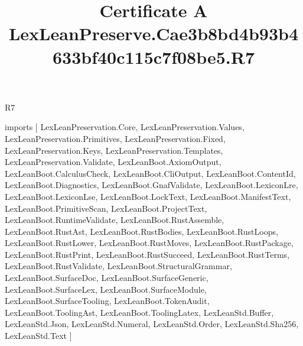 \begin{lexlean}{R7}
\title{Certificate A LexLeanPreserve.Cae3b8bd4b93b4633bf40c115c7f08be5.R7}
\begin{coremodule}
imports [
  LexLeanPreservation.Core,
  LexLeanPreservation.Values,
  LexLeanPreservation.Primitives,
  LexLeanPreservation.Fixed,
  LexLeanPreservation.Keys,
  LexLeanPreservation.Templates,
  LexLeanPreservation.Validate,
  LexLeanBoot.AxiomOutput,
  LexLeanBoot.CalculusCheck,
  LexLeanBoot.CliOutput,
  LexLeanBoot.ContentId,
  LexLeanBoot.Diagnostics,
  LexLeanBoot.GnafValidate,
  LexLeanBoot.LexiconLre,
  LexLeanBoot.LexiconLse,
  LexLeanBoot.LockText,
  LexLeanBoot.ManifestText,
  LexLeanBoot.PrimitiveScan,
  LexLeanBoot.ProjectText,
  LexLeanBoot.RuntimeValidate,
  LexLeanBoot.RustAssemble,
  LexLeanBoot.RustAst,
  LexLeanBoot.RustBodies,
  LexLeanBoot.RustLoops,
  LexLeanBoot.RustLower,
  LexLeanBoot.RustMoves,
  LexLeanBoot.RustPackage,
  LexLeanBoot.RustPrint,
  LexLeanBoot.RustSucceed,
  LexLeanBoot.RustTerms,
  LexLeanBoot.RustValidate,
  LexLeanBoot.StructuralGrammar,
  LexLeanBoot.SurfaceDoc,
  LexLeanBoot.SurfaceGeneric,
  LexLeanBoot.SurfaceLex,
  LexLeanBoot.SurfaceModule,
  LexLeanBoot.SurfaceTooling,
  LexLeanBoot.TokenAudit,
  LexLeanBoot.ToolingAst,
  LexLeanBoot.ToolingLatex,
  LexLeanStd.Buffer,
  LexLeanStd.Json,
  LexLeanStd.Numeral,
  LexLeanStd.Order,
  LexLeanStd.Sha256,
  LexLeanStd.Text
]


\end{coremodule}
\end{lexlean}
